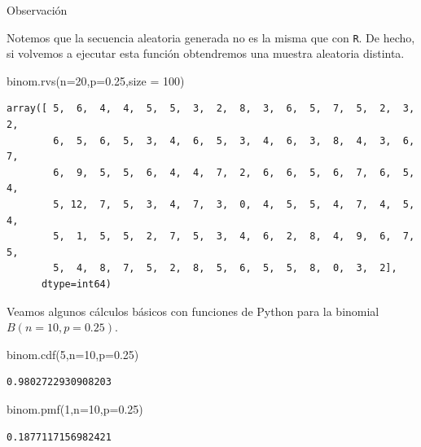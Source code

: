\documentclass[
  letterpaper,
  DIV=11,
  numbers=noendperiod]{scrreprt}
\newenvironment{Shaded}{\begin{snugshade}}{\end{snugshade}}
\newcommand{\DecValTok}[1]{\textcolor[rgb]{0.68,0.00,0.00}{#1}}
\newcommand{\FloatTok}[1]{\textcolor[rgb]{0.68,0.00,0.00}{#1}}
\newcommand{\NormalTok}[1]{\textcolor[rgb]{0.00,0.23,0.31}{#1}}
\newcommand{\OperatorTok}[1]{\textcolor[rgb]{0.37,0.37,0.37}{#1}}
\begin{document}
\begin{Advertencia}{Observación}{}

Notemos que la secuencia aleatoria generada no es la misma que con
\texttt{R}. De hecho, si volvemos a ejecutar esta función obtendremos
una muestra aleatoria distinta.

\begin{Shaded}
\begin{Highlighting}[]
\NormalTok{binom.rvs(n}\OperatorTok{=}\DecValTok{20}\NormalTok{,p}\OperatorTok{=}\FloatTok{0.25}\NormalTok{,size }\OperatorTok{=} \DecValTok{100}\NormalTok{)}
\end{Highlighting}
\end{Shaded}

\begin{verbatim}
array([ 5,  6,  4,  4,  5,  5,  3,  2,  8,  3,  6,  5,  7,  5,  2,  3,  2,
        6,  5,  6,  5,  3,  4,  6,  5,  3,  4,  6,  3,  8,  4,  3,  6,  7,
        6,  9,  5,  5,  6,  4,  4,  7,  2,  6,  6,  5,  6,  7,  6,  5,  4,
        5, 12,  7,  5,  3,  4,  7,  3,  0,  4,  5,  5,  4,  7,  4,  5,  4,
        5,  1,  5,  5,  2,  7,  5,  3,  4,  6,  2,  8,  4,  9,  6,  7,  5,
        5,  4,  8,  7,  5,  2,  8,  5,  6,  5,  5,  8,  0,  3,  2],
      dtype=int64)
\end{verbatim}

\end{Advertencia}

Veamos algunos cálculos básicos con funciones de Python para la binomial
\(B(n=10,p=0.25)\).

\begin{Shaded}
\begin{Highlighting}[]
\NormalTok{binom.cdf(}\DecValTok{5}\NormalTok{,n}\OperatorTok{=}\DecValTok{10}\NormalTok{,p}\OperatorTok{=}\FloatTok{0.25}\NormalTok{)}
\end{Highlighting}
\end{Shaded}

\begin{verbatim}
0.9802722930908203
\end{verbatim}

\begin{Shaded}
\begin{Highlighting}[]
\NormalTok{binom.pmf(}\DecValTok{1}\NormalTok{,n}\OperatorTok{=}\DecValTok{10}\NormalTok{,p}\OperatorTok{=}\FloatTok{0.25}\NormalTok{)}
\end{Highlighting}
\end{Shaded}

\begin{verbatim}
0.1877117156982421
\end{verbatim}
\end{document}
